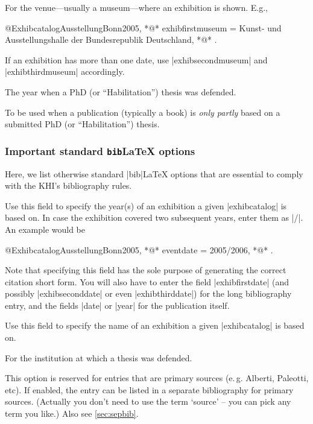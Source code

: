 \documentclass[a4paper,
10pt,
ngerman,
english
]{ltxdoc}
\begin{document}
For the venue---usually a museum---where an exhibition is shown. E.g.,
\begin{code}
@Exhibcatalog{AusstellungBonn2005,
  *@\ldots@*
  exhibfirstmuseum = {Kunst- und Ausstellungshalle der Bundesrepublik Deutschland},
  *@\ldots@*
}.
\end{code}
If an exhibition has more than one date, use |exhibsecondmuseum| and |exhibthirdmuseum| accordingly.

The year when a PhD (or \enquote{Habilitation}) thesis was defended.

To be used when a publication (typically a book) is \emph{only partly} based on a submitted PhD (or \enquote{Habilitation}) thesis.


\subsubsection{Important standard \texttt{bib}\LaTeX{} options}\label{sec:bibl-efields}
Here, we list otherwise standard |bib|\LaTeX{} options that are essential to comply with the KHI's bibliography rules.

Use this field to specify the year(s) of an exhibition a given |exhibcatalog| is based on. In case the exhibition covered two subsequent years, enter them as |/|. An example would be
\begin{code}
@Exhibcatalog{AusstellungBonn2005,
  *@\ldots@*
  eventdate = {2005/2006},
  *@\ldots@*
}.
\end{code}
Note that specifying this field has the sole purpose of generating the correct citation short form.
You will also have to enter the field |exhibfirstdate| (and possibly |exhibseconddate| or even |exhibthirddate|) for the long bibliography entry, and the fields |date| or |year| for the publication itself. 

Use this field to specify the name of an exhibition a given |exhibcatalog| is based on.

For the institution at which a thesis was defended.

This option is reserved for entries that are primary sources (e.\,g. Alberti, Paleotti, etc). %
If enabled, the entry can be listed in a separate bibliography for primary sources. (Actually you don't need to use the term \enquote*{source} -- you can pick any term you like.) Also see \cref{sec:sepbib}.
\end{document}
